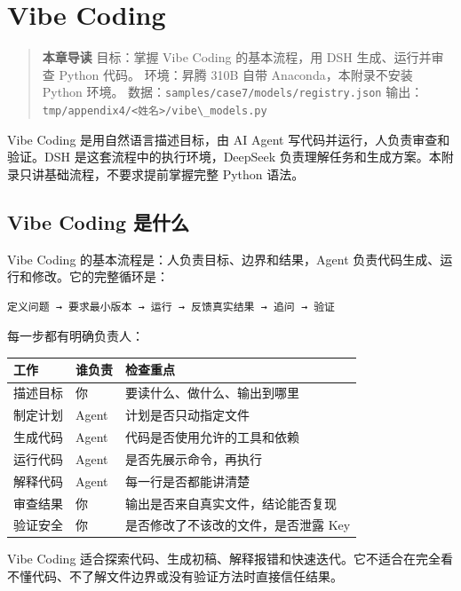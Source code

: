\chapter{Vibe Coding}\label{ux9644ux5f55-4vibe-coding}

\begin{quote}
\textbf{本章导读} 目标：掌握 Vibe Coding 的基本流程，用 DSH
生成、运行并审查 Python 代码。 环境：昇腾 310B 自带
Anaconda，本附录不安装 Python 环境。
数据：\passthrough{\lstinline!samples/case7/models/registry.json!}
输出：\passthrough{\lstinline!tmp/appendix4/<姓名>/vibe\_models.py!}
\end{quote}

Vibe Coding 是用自然语言描述目标，由 AI Agent
写代码并运行，人负责审查和验证。DSH 是这套流程中的执行环境，DeepSeek
负责理解任务和生成方案。本附录只讲基础流程，不要求提前掌握完整 Python
语法。

\section{Vibe Coding 是什么}\label{vibe-coding-ux662fux4ec0ux4e48}

Vibe Coding 的基本流程是：人负责目标、边界和结果，Agent
负责代码生成、运行和修改。它的完整循环是：

\begin{lstlisting}
定义问题 → 要求最小版本 → 运行 → 反馈真实结果 → 追问 → 验证
\end{lstlisting}

每一步都有明确负责人：

\begin{longtable}[]{@{}lll@{}}
\toprule\noalign{}
工作 & 谁负责 & 检查重点 \\
\midrule\noalign{}
\endhead
\bottomrule\noalign{}
\endlastfoot
描述目标 & 你 & 要读什么、做什么、输出到哪里 \\
制定计划 & Agent & 计划是否只动指定文件 \\
生成代码 & Agent & 代码是否使用允许的工具和依赖 \\
运行代码 & Agent & 是否先展示命令，再执行 \\
解释代码 & Agent & 每一行是否都能讲清楚 \\
审查结果 & 你 & 输出是否来自真实文件，结论能否复现 \\
验证安全 & 你 & 是否修改了不该改的文件，是否泄露 Key \\
\end{longtable}

Vibe Coding
适合探索代码、生成初稿、解释报错和快速迭代。它不适合在完全看不懂代码、不了解文件边界或没有验证方法时直接信任结果。

